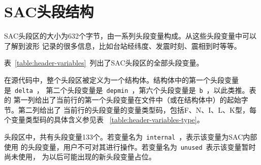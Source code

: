 \section{SAC头段结构}
SAC头段区的大小为632个字节，由一系列头段变量构成。从这些头段变量中可以了解到波形
记录的很多信息，比如台站经纬度、发震时刻、震相到时等等。

表~\ref{table:header-variables}~列出了SAC头段区的全部头段变量。

在源代码中，整个头段区被定义为一个结构体。结构体中的第一个头段变量是~\verb+delta+~，
第二个头段变量是~\verb+depmin+~，第六个头段变量是~\verb+b+~，以此类推。表的
第一列给出了当前行的第一个头段变量在文件中（或在结构体中）的起始字节。第二列给出了
当前行的头段变量的变量类型码，包括F、N、I、L、K型，每个变量类型码的具体含义参见表
~\ref{table:header-variables-type}。

头段区中，共有头段变量133个。若变量名为~\verb+internal+~，表示该变量为SAC内部使用
的头段变量，用户不可对其进行操作。若变量名为~\verb+unused+~表示该变量暂时尚未使用，
为以后可能出现的新头段变量占位。


